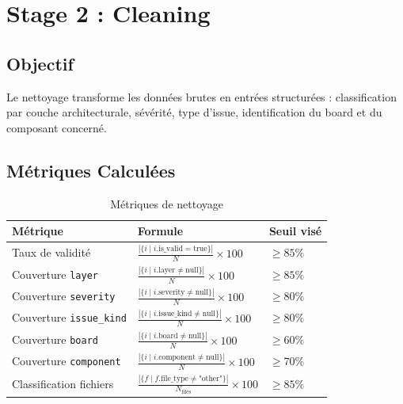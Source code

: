 \documentclass[a4paper,12pt]{article}
\begin{document}
\section{Stage 2 : Cleaning}

\subsection{Objectif}

Le nettoyage transforme les données brutes en entrées structurées : classification par couche architecturale, sévérité, type d'issue, identification du board et du composant concerné.

\subsection{Métriques Calculées}

\begin{table}[H]
\centering
\caption{Métriques de nettoyage}
\label{tab:cleaning}
\begin{tabular}{>{\raggedright}p{5cm} p{6cm} p{3cm}}
\toprule
\textbf{Métrique} & \textbf{Formule} & \textbf{Seuil visé} \\
\midrule
Taux de validité & $\displaystyle \frac{|\{i \mid i.\text{is\_valid} = \text{true}\}|}{N} \times 100$ & $\geq 85\%$ \\[12pt]
Couverture \texttt{layer} & $\displaystyle \frac{|\{i \mid i.\text{layer} \neq \text{null}\}|}{N} \times 100$ & $\geq 85\%$ \\[12pt]
Couverture \texttt{severity} & $\displaystyle \frac{|\{i \mid i.\text{severity} \neq \text{null}\}|}{N} \times 100$ & $\geq 80\%$ \\[12pt]
Couverture \texttt{issue\_kind} & $\displaystyle \frac{|\{i \mid i.\text{issue\_kind} \neq \text{null}\}|}{N} \times 100$ & $\geq 80\%$ \\[12pt]
Couverture \texttt{board} & $\displaystyle \frac{|\{i \mid i.\text{board} \neq \text{null}\}|}{N} \times 100$ & $\geq 60\%$ \\[12pt]
Couverture \texttt{component} & $\displaystyle \frac{|\{i \mid i.\text{component} \neq \text{null}\}|}{N} \times 100$ & $\geq 70\%$ \\[12pt]
Classification fichiers & $\displaystyle \frac{|\{f \mid f.\text{file\_type} \neq \text{"other"}\}|}{N_{\text{files}}} \times 100$ & $\geq 85\%$ \\
\bottomrule
\end{tabular}
\end{table}
\end{document}
